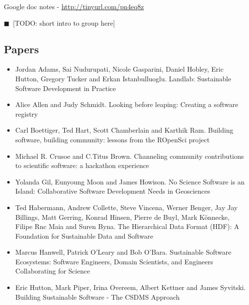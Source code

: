 \documentclass[11pt, oneside]{amsart}
\newcommand{\todo}[1]{{\color{blue}$\blacksquare$~\textsf{[TODO: #1]}}}
\begin{document}
Google doc notes - \url{http://tinyurl.com/pn4eq8z}

\todo{short intro to group here}

\subsection{Papers}
\begin{itemize}
\item Jordan Adams, Sai Nudurupati, Nicole Gasparini, Daniel Hobley, Eric
Hutton, Gregory Tucker and Erkan Istanbulluoglu. Landlab: Sustainable Software
Development in Practice ~\cite{wssspe2_adams}

\item Alice Allen and Judy Schmidt. Looking before leaping: Creating a software
registry~\cite{wssspe2_allen}

\item Carl Boettiger, Ted Hart, Scott Chamberlain and Karthik Ram. Building
software, building community: lessons from the {ROpenSci}
project~\cite{wssspe2_boettiger}

\item Michael R. Crusoe and C.Titus Brown. Channeling community contributions to
scientific software: a hackathon experience~\cite{wssspe2_crusoe}

\item Yolanda Gil, Eunyoung Moon and James Howison. No Science Software is an
Island: Collaborative Software Development Needs in
Geosciences~\cite{wssspe2_gil}

\item Ted Habermann, Andrew Collette, Steve Vincena, Werner Benger, Jay Jay
Billings, Matt Gerring, Konrad Hinsen, Pierre de Buyl, Mark K\"{o}nnecke, Filipe
Rnc Maia and Suren Byna. The Hierarchical Data Format ({HDF}): A Foundation for
Sustainable Data and Software~\cite{wssspe2_habermann}

\item Marcus Hanwell, Patrick O'Leary and Bob O'Bara. Sustainable Software
Ecosystems: Software Engineers, Domain Scientists, and Engineers Collaborating
for Science~\cite{wssspe2_hanwell}

\item Eric Hutton, Mark Piper, Irina Overeem, Albert Kettner and James Syvitski.
Building Sustainable Software - The {CSDMS} Approach~\cite{wssspe2_hutton}


\end{itemize}
\end{document}
